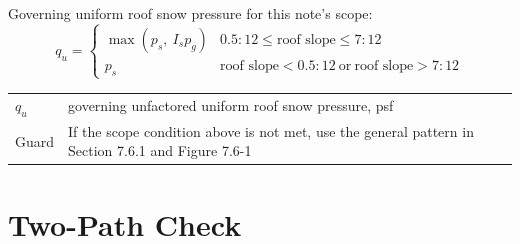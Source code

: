 \documentclass[10pt]{article}
\begin{document}
Governing uniform roof snow pressure for this note's scope:
\begin{equation*}
q_u=
\begin{cases}
\max\!\left(p_s,\ I_sp_g\right)
& 0.5{:}12\leq\text{roof slope}\leq7{:}12 \\[3pt]
p_s
& \text{roof slope}<0.5{:}12\ \text{or}\ \text{roof slope}>7{:}12
\end{cases}
\end{equation*}

{\ttfamily\footnotesize
\begin{tabular}{@{}ll@{}}
$q_u$ & governing unfactored uniform roof snow pressure, psf \\
Guard & If the scope condition above is not met, use the general pattern in Section 7.6.1 and Figure 7.6-1 \\
\end{tabular}
}

\section{Two-Path Check}
\end{document}

